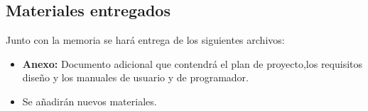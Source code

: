 \subsection{Materiales entregados}
Junto con la memoria se hará entrega de los siguientes archivos:
	\begin{itemize}
	\item \textbf{Anexo:} Documento adicional que contendrá el plan de proyecto,los requisitos diseño y los manuales de usuario y de programador.
	\item Se añadirán nuevos materiales. 
	\end{itemize}